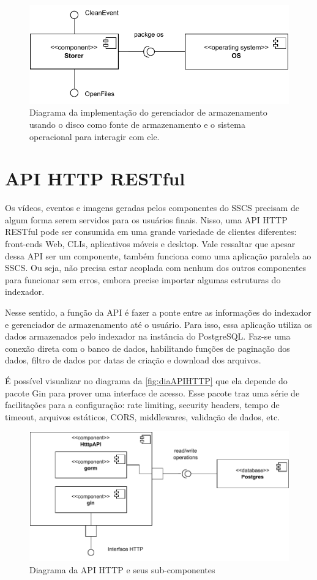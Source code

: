 \documentclass[12pt, %
openright, 
oneside, %
a4paper,    %
brazil]{facom-ufu-abntex2}
\begin{document}
\begin{figure}[!ht]
	\centering
	\includegraphics[width=0.8\linewidth]{storer_os.pdf}
	\caption[Diagrama da implementação do gerenciador de armazenamento
		usando o sistema operacional]{Diagrama da implementação do gerenciador de
		armazenamento usando o disco como fonte de armazenamento e o sistema
		operacional para interagir com ele.}
	\label{fig:diaArmDisc}
\end{figure}

\section{API HTTP RESTful}

Os vídeos, eventos e imagens geradas pelos componentes do SSCS precisam de
algum forma serem servidos para os usuários finais. Nisso, uma API HTTP RESTful
pode ser consumida em uma grande variedade de clientes diferentes: front-ends
Web, CLIs, aplicativos móveis e desktop. Vale ressaltar que apesar dessa API
ser um componente, também funciona como uma aplicação paralela ao SSCS. Ou
seja, não precisa estar acoplada com nenhum dos outros componentes para
funcionar sem erros, embora precise importar algumas estruturas do indexador.

Nesse sentido, a função da API é fazer a ponte entre as informações do
indexador e gerenciador  de armazenamento até o usuário. Para isso, essa
aplicação utiliza os dados armazenados pelo indexador na instância do
PostgreSQL. Faz-se uma conexão direta com o banco de dados, habilitando funções
de paginação dos dados, filtro de dados por datas de criação e download dos
arquivos.

É possível visualizar no diagrama da \autoref{fig:diaAPIHTTP} que ela depende
do pacote Gin para prover uma interface de acesso. Esse pacote traz uma série
de facilitações para a configuração: rate limiting, security headers, tempo de
timeout, arquivos estáticos, CORS, middlewares, validação de dados, etc.

\begin{figure}[!ht]
	\centering
	\includegraphics[width=0.8\linewidth]{api_http.pdf}
	\caption[Diagrama da implementação da API HTTP]{Diagrama da API HTTP e
		seus sub-componentes}
	\label{fig:diaAPIHTTP}
\end{figure}
\end{document}
